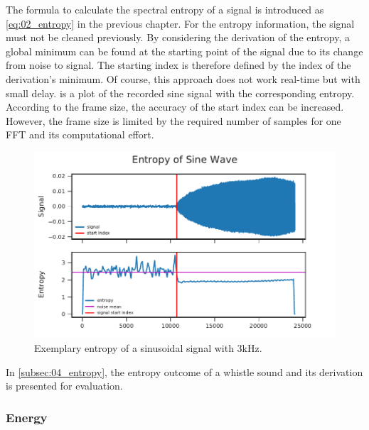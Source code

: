 The formula to calculate the spectral entropy of a signal is introduced as
\cref{eq:02_entropy} in the previous chapter.
For the entropy information, the signal must not be cleaned previously.
By considering the derivation of the entropy, a global minimum can be found
at the starting point of the signal due to its change from noise to signal.
The starting index is therefore defined by the index of the derivation's minimum.
Of course, this approach does not work real-time but with small delay.
 is a plot of the recorded sine signal with the corresponding
entropy.
According to the frame size, the accuracy of the start index can be increased.
However, the frame size is limited by the required number of samples for one \ac{FFT} and
its computational effort.
\begin{figure}[ht]
	\centering
		\includegraphics[]{figures/sine_entropy}
	\caption{Exemplary entropy of a sinusoidal signal with 3\si{\kilo\hertz}.}
	\label{fig:03_entropy}
\end{figure}
In \cref{subsec:04_entropy}, the entropy outcome of a whistle sound
and its derivation is presented for evaluation.

\subsubsection*{Energy}

